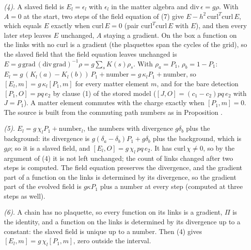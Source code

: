 \emph{(4).} A slaved field is $E_{l} = \epsilon_{l}$ with $\epsilon_{l}$ in the matter algebra and $\mathrm{div}\,\epsilon = g\rho$. With $A = 0$ at the start, two steps of the field equation of (7) give $E - h^{2}\,\mathrm{curl}^{T}\mathrm{curl}\,E$, which equals $E$ exactly when $\mathrm{curl}\,E = 0$ (pair $\mathrm{curl}^{T}\mathrm{curl}\,E$ with $E$), and then every later step leaves $E$ unchanged, $A$ staying a gradient. On the box a function on the links with no curl is a gradient (the plaquettes span the cycles of the grid), so the slaved field that the field equation leaves unchanged is $E = g\,\mathrm{grad}\,(\mathrm{div}\,\mathrm{grad})^{-1}\rho = g\sum_{s}K(s)\rho_{s}$. With $\rho_{a} = P_{1}$, $\rho_{b} = 1 - P_{1}$: $E_{l} = g\,(K_{l}(a) - K_{l}(b))\,P_{1} + \text{number} = g\,\kappa_{l}P_{1} + \text{number}$, so $[E_{l}, m] = g\,\kappa_{l}[P_{1}, m]$ for every matter element $m$, and for the bare detection $[P_{1}, O] = pq\,e_{2}$ by clause (1) of the stored model ($[J, O] = (c_{1} - c_{2})pq\,e_{2}$ with $J = P_{1}$). A matter element commutes with the charge exactly when $[P_{1}, m] = 0$. The source is built from the commuting path numbers as in Proposition .

\emph{(5).} $E_{l} = g\,\chi_{l}P_{1} + \text{number}_{l}$, the numbers with divergence $g\delta_{b}$ plus the background: its divergence is $g(\delta_{a} - \delta_{b})P_{1} + g\delta_{b}$ plus the background, which is $g\rho$; so it is a slaved field, and $[E_{l}, O] = g\,\chi_{l}\,pq\,e_{2}$. It has $\mathrm{curl}\,\chi \neq 0$, so by the argument of (4) it is not left unchanged; the count of links changed after two steps is computed. The field equation preserves the divergence, and the gradient part of a function on the links is determined by its divergence, so the gradient part of the evolved field is $g\kappa P_{1}$ plus a number at every step (computed at three steps as well).

\emph{(6).} A chain has no plaquette, so every function on its links is a gradient, $\Pi$ is the identity, and a function on the links is determined by its divergence up to a constant: the slaved field is unique up to a number. Then (4) gives $[E_{l}, m] = g\,\chi_{l}[P_{1}, m]$, zero outside the interval.

